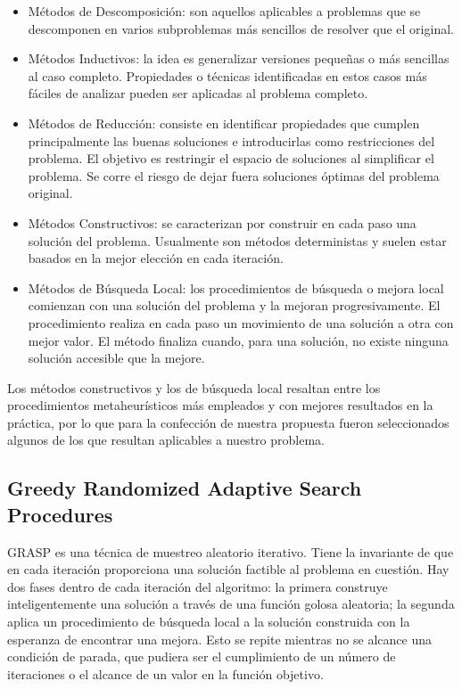 \documentclass[a4paper,openright,11pt,oneside]{book}
\begin{document}
	\begin{itemize}
		\item Métodos de Descomposición: son aquellos aplicables a problemas que se descomponen en varios subproblemas más sencillos de resolver que el original.
		
		\item Métodos Inductivos: la idea es generalizar versiones pequeñas o más sencillas al caso completo. Propiedades o técnicas identificadas en estos casos más fáciles de analizar pueden ser aplicadas al problema completo.
		
		\item Métodos de Reducción: consiste en identificar propiedades que cumplen principalmente las buenas soluciones e introducirlas como restricciones del problema.  El objetivo es restringir el espacio de soluciones al simplificar el problema. Se corre el riesgo de dejar fuera soluciones óptimas del problema original.
		
		\item Métodos Constructivos: se caracterizan por construir en cada paso una solución del problema. Usualmente son  métodos deterministas y suelen estar basados en la mejor elección en cada iteración.
		
		\item Métodos de Búsqueda Local: los  procedimientos  de  búsqueda o mejora local comienzan con una solución del problema y la mejoran progresivamente.  El procedimiento realiza en cada paso un movimiento de una solución a otra con mejor valor. El método finaliza cuando, para una solución, no existe ninguna solución accesible que la mejore.
	\end{itemize}
	
		Los métodos constructivos y los de búsqueda local resaltan entre los procedimientos metaheurísticos más empleados y con mejores resultados en la práctica, por lo que para la confección de nuestra propuesta fueron seleccionados algunos de los que resultan aplicables a nuestro problema. 
	
		\subsection{Greedy Randomized Adaptive Search Procedures} \label{sub:GRASP}
		GRASP \cite{GRASP} es una técnica de muestreo aleatorio iterativo. Tiene la invariante de que en cada iteración proporciona una solución factible al problema en cuestión. Hay dos fases dentro de cada iteración del algoritmo: la primera construye inteligentemente una solución a través de una función golosa aleatoria; la segunda aplica un procedimiento de búsqueda local a la solución construida con la esperanza de encontrar una mejora. Esto se repite mientras no se alcance una condición de parada, que pudiera ser el cumplimiento de un número de iteraciones o el alcance de un valor en la función objetivo.
		
\end{document}
